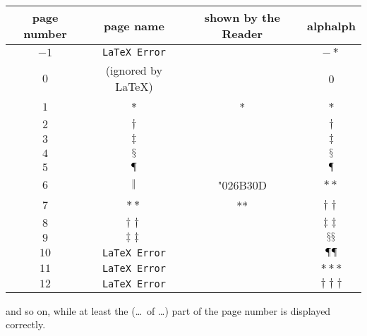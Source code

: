 \documentclass[british]{article}
\begin{document}
\begin{tabular}{c|c|c|c}
page number & page name         & shown by the Reader & \textsf{alphalph}                      \\ \hline
$-1$ & \texttt{LaTeX Error}                &          & \ensuremath  {- *}                            \\
 $0$ & (ignored by \LaTeX)                 &          & 0                                             \\
 $1$ & \ensuremath  {*}                    & *        & \ensuremath  {*}                              \\
 $2$ & \ensuremath  {\dagger }             &          & \ensuremath  {\dagger }                       \\
 $3$ & \ensuremath  {\ddagger }            &          & \ensuremath  {\ddagger }                      \\
 $4$ & \ensuremath  {\mathsection }        &          & \ensuremath  {\mathsection }                  \\
 $5$ & \ensuremath  {\mathparagraph }      &          & \ensuremath  {\mathparagraph }                \\
 $6$ & \ensuremath  {\delimiter "026B30D } & "026B30D & \ensuremath  {**}                             \\
 $7$ & \ensuremath  {**}                   & **       & \ensuremath  {\dagger \dagger }               \\
 $8$ & \ensuremath  {\dagger \dagger }     &          & \ensuremath  {\ddagger \ddagger }             \\
 $9$ & \ensuremath  {\ddagger \ddagger }   &          & \ensuremath  {\mathsection \mathsection }     \\
$10$ & \texttt{LaTeX Error}                &          & \ensuremath  {\mathparagraph \mathparagraph } \\
$11$ & \texttt{LaTeX Error}                &          & \ensuremath  {***}                            \\
$12$ & \texttt{LaTeX Error}                &          & \ensuremath  {\dagger \dagger \dagger }       \\
\end{tabular}

\noindent and so on, while at least the (\ldots\ of \ldots ) part
of the page number is displayed correctly.\\

\bigskip
\end{document}
